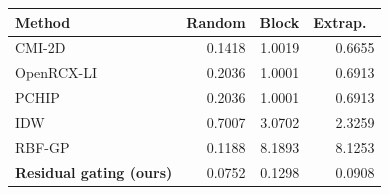 \small
\begin{tabular}{lrrr}\toprule
Method & Random & Block & Extrap.\ \\\midrule
CMI-2D & 0.1418 & 1.0019 & 0.6655 \\
OpenRCX-LI & 0.2036 & 1.0001 & 0.6913 \\
PCHIP & 0.2036 & 1.0001 & 0.6913 \\
IDW & 0.7007 & 3.0702 & 2.3259 \\
RBF-GP & 0.1188 & 8.1893 & 8.1253 \\
\textbf{Residual gating (ours)} & 0.0752 & 0.1298 & 0.0908 \\
\bottomrule\end{tabular}
